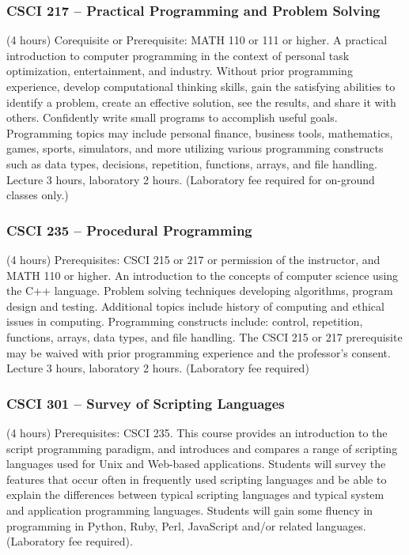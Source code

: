 \subsubsection{CSCI 217 -- Practical Programming and Problem Solving}
(4 hours) Corequisite or Prerequisite: MATH 110 or 111 or higher. A practical introduction to computer programming in the context of personal task optimization, entertainment, and industry. Without prior programming experience, develop computational thinking skills, gain the satisfying abilities to identify a problem, create an effective solution, see the results, and share it with others. Confidently write small programs to accomplish useful goals. Programming topics may include personal finance, business tools, mathematics, games, sports, simulators, and more utilizing various programming constructs such as data types, decisions, repetition, functions, arrays, and file handling. Lecture 3 hours, laboratory 2 hours. (Laboratory fee required for on-ground classes only.)

\subsubsection{CSCI 235 -- Procedural Programming}
(4 hours) Prerequisites: CSCI 215 or 217 or permission of the instructor, and MATH 110 or higher. An introduction to the concepts of computer science using the C++ language. Problem solving techniques developing algorithms, program design and testing. Additional topics include history of computing and ethical issues in computing. Programming constructs include: control, repetition, functions, arrays, data types, and file handling. The CSCI 215 or 217 prerequisite may be waived with prior programming experience and the professor’s consent. Lecture 3 hours, laboratory 2 hours. (Laboratory fee required)

\subsubsection{CSCI 301 -- Survey of Scripting Languages}
(4 hours) Prerequisites: CSCI 235. This course provides an introduction to the script programming paradigm, and introduces and compares a range of scripting languages used for Unix and Web-based applications. Students will survey the features that occur often in frequently used scripting languages and be able to explain the differences between typical scripting languages and typical system and application programming languages. Students will gain some fluency in programming in Python, Ruby, Perl, JavaScript and/or related languages. (Laboratory fee required).

